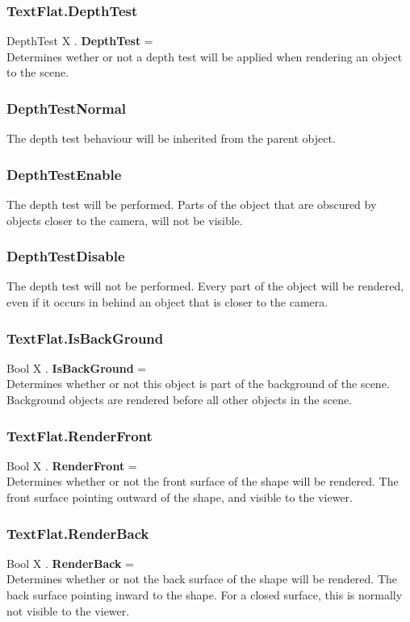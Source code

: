\subsubsection{TextFlat.DepthTest \label{F:TextFlat:DepthTest}}
DepthTest X . \textbf{DepthTest} = \\
Determines wether or not a depth test will be applied when rendering an object to the scene.

\subsubsection{DepthTestNormal \label{T:DepthTest|DepthTestNormal}}
The depth test behaviour will be inherited from the parent object.

\subsubsection{DepthTestEnable \label{T:DepthTest|DepthTestEnable}}
The depth test will be performed. Parts of the object that are obscured by objects closer to the camera, will not be visible.

\subsubsection{DepthTestDisable \label{T:DepthTest|DepthTestDisable}}
The depth test will not be performed. Every part of the object will be rendered, even if it occurs in behind an object that is closer to the camera.

\subsubsection{TextFlat.IsBackGround \label{F:TextFlat:IsBackGround}}
Bool X . \textbf{IsBackGround} = \\
Determines whether or not this object is part of the background of the scene. Background objects are rendered before all other objects in the scene.

\subsubsection{TextFlat.RenderFront \label{F:TextFlat:RenderFront}}
Bool X . \textbf{RenderFront} = \\
Determines whether or not the front surface of the shape will be rendered. The front surface pointing outward of the shape, and visible to the viewer.

\subsubsection{TextFlat.RenderBack \label{F:TextFlat:RenderBack}}
Bool X . \textbf{RenderBack} = \\
Determines whether or not the back surface of the shape will be rendered. The back surface pointing inward to the shape. For a closed surface, this is normally not visible to the viewer.

